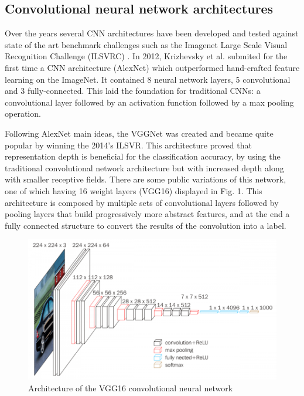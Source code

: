 \documentclass[journal,compsoc]{IEEEtran}
\begin{document}
\subsection{Convolutional neural network architectures}
Over the years several CNN architectures have been developed and tested against state of the art benchmark challenges such as the Imagenet Large Scale Visual Recognition Challenge (ILSVRC) \cite{ilsvrc}. In 2012, Krizhevsky et al. \cite{alexnet} submited for the first time a CNN architecture (AlexNet) which outperformed hand-crafted feature learning on the ImageNet. It contained 8 neural network layers, 5 convolutional and 3 fully-connected. This laid the foundation for traditional CNNs: a convolutional layer followed by an activation function followed by a max pooling operation. \par
Following AlexNet main ideas, the VGGNet\cite{vggnet} was created and became quite popular by winning the 2014’s ILSVR. This architecture proved that representation depth is beneficial for the classification accuracy, by using the traditional convolutional network architecture but with increased depth along with smaller receptive fields. There are some public variations of this network, one of which having 16 weight layers (VGG16) displayed in Fig. 1. This architecture is composed by multiple sets of convolutional layers followed by pooling layers that build progressively more abstract features, and at the end a fully connected structure to convert the results of the convolution into a label.
\begin{figure}[ht]
  \centering
    \includegraphics[scale=0.5, width=\linewidth]{figures/vgg16.png}
  \caption{Architecture of the VGG16 convolutional neural network \cite{vggnet}}
\end{figure}
\end{document}

